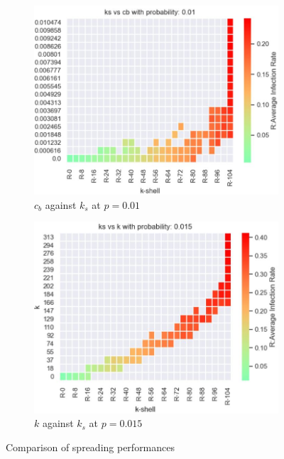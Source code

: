 \documentclass[11pt,a4,twocolumn]{article}
\begin{document}
\begin{figure}[h]
\begin{subfigure}{.5\textwidth}
	\centerline{\includegraphics[scale=.5]{ks-cb-01.jpg}}
	\caption{$c_{b}$ against $k_{s}$ at $p=0.01$}
	\label{fig:fig1}
\end{subfigure}
\begin{subfigure}{.5\textwidth}
	\centerline{\includegraphics[scale=.5]{ks-k-015.jpg}}
	\caption{$k$ against $k_{s}$ at $p=0.015$}
	\label{fig:fig2}
\end{subfigure}
\caption{Comparison of spreading performances}
\label{fig:fig}
\end{figure}
\end{document}
